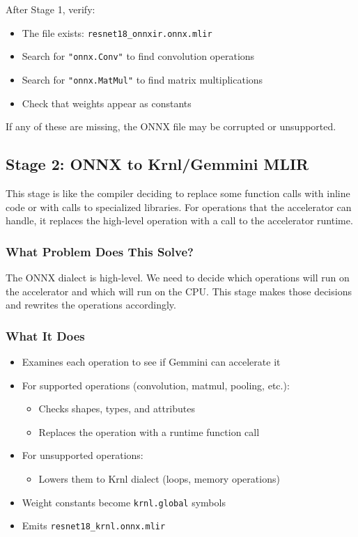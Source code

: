 \documentclass[12pt,a4paper]{article}
\begin{document}
\begin{infoboxenv}
After Stage 1, verify:
\begin{itemize}
  \item The file exists: \texttt{resnet18\_onnxir.onnx.mlir}
  \item Search for \texttt{"onnx.Conv"} to find convolution operations
  \item Search for \texttt{"onnx.MatMul"} to find matrix multiplications
  \item Check that weights appear as constants
\end{itemize}
If any of these are missing, the ONNX file may be corrupted or unsupported.
\end{infoboxenv}

\subsection{Stage 2: ONNX to Krnl/Gemmini MLIR}

\begin{analogyenv}
This stage is like the compiler deciding to replace some function calls with inline code or with calls to specialized libraries. For operations that the accelerator can handle, it replaces the high-level operation with a call to the accelerator runtime.
\end{analogyenv}

\subsubsection{What Problem Does This Solve?}
The ONNX dialect is high-level. We need to decide which operations will run on the accelerator and which will run on the CPU. This stage makes those decisions and rewrites the operations accordingly.

\subsubsection{What It Does}
\begin{itemize}
  \item Examines each operation to see if Gemmini can accelerate it
  \item For supported operations (convolution, matmul, pooling, etc.):
    \begin{itemize}
      \item Checks shapes, types, and attributes
      \item Replaces the operation with a runtime function call
    \end{itemize}
  \item For unsupported operations:
    \begin{itemize}
      \item Lowers them to Krnl dialect (loops, memory operations)
    \end{itemize}
  \item Weight constants become \texttt{krnl.global} symbols
  \item Emits \texttt{resnet18\_krnl.onnx.mlir}
\end{itemize}
\end{document}
